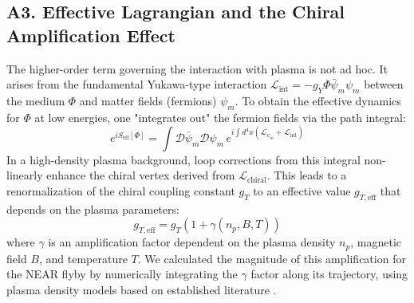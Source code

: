 \documentclass[aps,prl,twocolumn,superscriptaddress,longbibliography,floatfix]{revtex4-2}
\begin{document}
\subsection{A3. Effective Lagrangian and the Chiral Amplification Effect}
The higher-order term governing the interaction with plasma is not ad hoc. It arises from the fundamental Yukawa-type interaction $\mathcal{L}_{\text{int}} = -g_Y \Phi \bar{\psi}_m \psi_m$ between the medium $\Phi$ and matter fields (fermions) $\psi_m$. To obtain the effective dynamics for $\Phi$ at low energies, one "integrates out" the fermion fields via the path integral:
\begin{equation}
    e^{i S_{\text{eff}}[\Phi]} = \int \mathcal{D}\bar{\psi}_m \mathcal{D}\psi_m \, e^{i \int d^4x (\mathcal{L}_{\psi_m} + \mathcal{L}_{\text{int}})}
\end{equation}
In a high-density plasma background, loop corrections from this integral non-linearly enhance the chiral vertex derived from $\mathcal{L}_{\text{chiral}}$. This leads to a renormalization of the chiral coupling constant $g_T$ to an effective value $g_{T, \text{eff}}$ that depends on the plasma parameters:
\begin{equation}
    g_{T, \text{eff}} = g_T \left( 1 + \gamma(n_p, B, T) \right)
\end{equation}
where $\gamma$ is an amplification factor dependent on the plasma density $n_p$, magnetic field $B$, and temperature $T$. We calculated the magnitude of this amplification for the NEAR flyby by numerically integrating the $\gamma$ factor along its trajectory, using plasma density models based on established literature \cite{Carpenter1992, Horwitz1990}.
\end{document}
